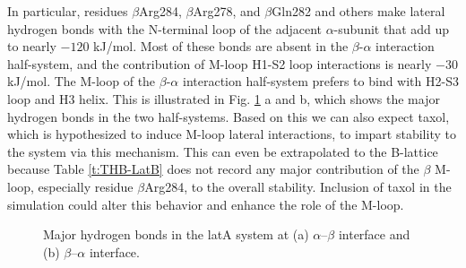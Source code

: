 \documentclass[11pt]{report}
\begin{document}
In particular, residues $\beta$Arg284, $\beta$Arg278, and $\beta$Gln282 and
others make lateral hydrogen bonds with the N-terminal loop of the adjacent $\alpha$-subunit that add up to nearly $-120$ kJ/mol. Most of these bonds are absent in the $\beta$-$\alpha$ interaction half-system, and the contribution of M-loop H1-S2 loop interactions is nearly $-30$ kJ/mol. The M-loop of the $\beta$-$\alpha$ interaction half-system prefers to bind with H2-S3 loop and H3 helix. This is illustrated in Fig. \ref{f:THB-latA} a and b, which shows the major hydrogen bonds in the two half-systems. Based on this we can also expect taxol, which is hypothesized to induce M-loop lateral interactions, to impart stability to the system via this mechanism. This can even be extrapolated to the B-lattice because 
Table \ref{t:THB-LatB} 
does not record any major contribution of the $\beta$ M-loop, especially residue $\beta$Arg284, to the overall stability. Inclusion of taxol in the simulation could alter this behavior and enhance the role of the M-loop.
\begin{figure}
  \centering
  \caption[Major hydrogen bonds in the LatA system]{Major hydrogen bonds in the latA system at (a) $\alpha$--$\beta$ interface
    and (b) $\beta$--$\alpha$ interface.}
  \hspace{0.05\linewidth}
  \label{f:THB-latA}
\end{figure}
\end{document}
